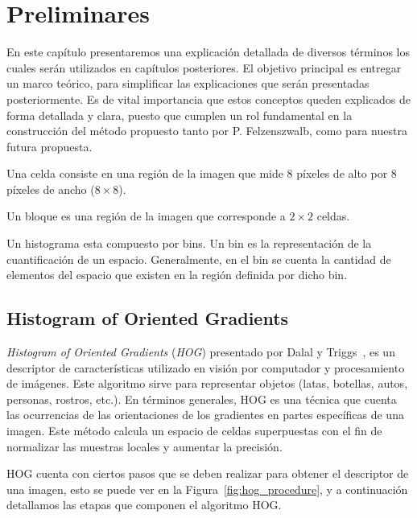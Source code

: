 \chapter[Preliminares ]{Preliminares }\label{ch:capitulo3}

En este capítulo presentaremos una explicación detallada de diversos términos los cuales serán utilizados en capítulos posteriores. El objetivo principal es entregar un marco teórico, para simplificar las explicaciones que serán presentadas posteriormente. Es de vital importancia que estos conceptos queden explicados de forma detallada y clara, puesto que cumplen un rol fundamental en la construcción del método propuesto tanto por P. Felzenszwalb, como para nuestra futura propuesta.

\begin{definition}[Celdas]
\label{def:cel}
Una celda consiste en una región de la imagen que mide $8$ píxeles de alto por $8$ píxeles de ancho ($8 \times 8$).
\end{definition}

\begin{definition}[Bloques]
\label{def:blo}
Un bloque es una región de la imagen que corresponde a $2 \times 2$ celdas.
\end{definition}

\begin{definition}[Bins]
\label{def:bin}
Un histograma esta compuesto por bins. Un bin es la representación de la cuantificación de un espacio. Generalmente, en el bin se cuenta la cantidad de elementos del espacio que existen en la región definida por dicho bin. 
\end{definition}

\section{Histogram of Oriented Gradients}\label{subsec:hog}
\textit{Histogram of Oriented Gradients} (\textit{HOG}) presentado por Dalal y Triggs~\cite{hog2005}, es un descriptor de características utilizado en visión por computador y procesamiento de imágenes. Este algoritmo sirve para representar objetos (latas, botellas, autos, personas, rostros, etc.). En términos generales, HOG es una técnica que cuenta las ocurrencias de las orientaciones de los gradientes en partes específicas de una imagen. Este método calcula un espacio de celdas superpuestas con el fin de normalizar las muestras locales y aumentar la precisión.

HOG cuenta con ciertos pasos que se deben realizar para obtener el descriptor de una imagen, esto se puede ver en la Figura~\ref{fig:hog_procedure}, y a continuación detallamos las etapas que componen el algoritmo HOG.

